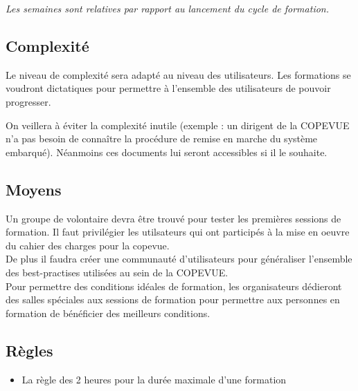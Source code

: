 \textit{Les semaines sont relatives par rapport au lancement du cycle de formation.}


\subsection{Complexité}

Le niveau de complexité sera adapté au niveau des utilisateurs. Les formations
se voudront dictatiques pour permettre à l'ensemble des utilisateurs de pouvoir
progresser.

On veillera à éviter la complexité inutile (exemple : un dirigent de la COPEVUE
n'a pas besoin de connaître la procédure de remise en marche du système embarqué). 
Néanmoins ces documents lui seront accessibles si il le souhaite.

\subsection{Moyens}

Un groupe de volontaire devra être trouvé pour tester les premières sessions de
formation. Il faut privilégier les utilsateurs qui ont participés à la mise en
oeuvre du cahier des charges pour la copevue. \\

De plus il faudra créer une communauté d'utilisateurs pour généraliser l'ensemble
des best-practises utilisées au sein de la COPEVUE. \\

Pour permettre des conditions idéales de formation, les organisateurs dédieront 
des salles spéciales aux sessions de formation pour permettre aux personnes en 
formation de bénéficier des meilleurs conditions.




\subsection{Règles}

\begin{itemize}
	\item La règle des 2 heures pour la durée maximale d'une formation
\end{itemize}

